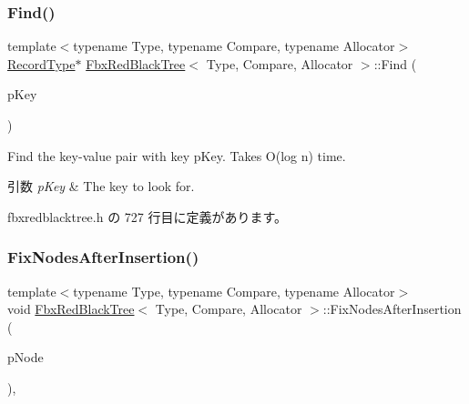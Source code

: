 \subsubsection{\texorpdfstring{Find()}{Find()}\hspace{0.1cm}{\footnotesize\ttfamily [2/2]}}
{\footnotesize\ttfamily template$<$typename Type, typename Compare, typename Allocator$>$ \\
\hyperlink{class_fbx_red_black_tree_1_1_record_type}{Record\+Type}$\ast$ \hyperlink{class_fbx_red_black_tree}{Fbx\+Red\+Black\+Tree}$<$ Type, Compare, Allocator $>$\+::Find (\begin{DoxyParamCaption}\item[{const \hyperlink{class_fbx_red_black_tree_a241b31c6972995417d193458b7bb27e2}{Key\+Type} \&}]{p\+Key }\end{DoxyParamCaption})\hspace{0.3cm}{\ttfamily [inline]}}

Find the key-\/value pair with key p\+Key. Takes O(log n) time. 
\begin{DoxyParams}{引数}
{\em p\+Key} & The key to look for. \\
\hline
\end{DoxyParams}


 fbxredblacktree.\+h の 727 行目に定義があります。

\mbox{\label{class_fbx_red_black_tree_ac553d028cbea6ac90b0b42d161b5843c}} 
\subsubsection{\texorpdfstring{Fix\+Nodes\+After\+Insertion()}{FixNodesAfterInsertion()}}
{\footnotesize\ttfamily template$<$typename Type, typename Compare, typename Allocator$>$ \\
void \hyperlink{class_fbx_red_black_tree}{Fbx\+Red\+Black\+Tree}$<$ Type, Compare, Allocator $>$\+::Fix\+Nodes\+After\+Insertion (\begin{DoxyParamCaption}\item[{\hyperlink{class_fbx_red_black_tree_1_1_record_type}{Record\+Type} $\ast$}]{p\+Node }\end{DoxyParamCaption})\hspace{0.3cm}{\ttfamily [inline]}, {\ttfamily [protected]}}



